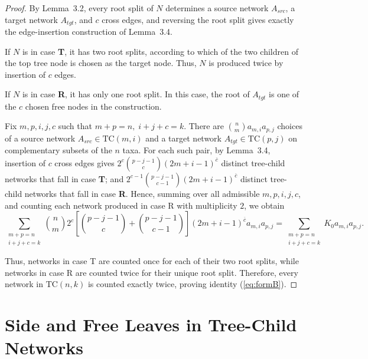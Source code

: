 \documentclass[11pt]{article}
\theoremstyle{definition}
\theoremstyle{remark}
\newcommand{\TC}{\text{TC}}
\begin{document}
\begin{proof}
By Lemma~3.2, every root split of $N$
determines a source network $A_{src}$, a target network $A_{tgt}$, and $c$
cross edges, and reversing the root split gives exactly the
edge-insertion construction of Lemma~3.4.

If $N$ is in case \textbf{T}, it has two root splits, according to
which of the two children of the top tree node is chosen as the target
node. Thus, $N$ is produced twice by insertion of $c$ edges.

If $N$ is in case \textbf{R}, it has only one root split. In this case, the root of $A_{tgt}$ is one of the $c$ chosen free nodes in the construction. 

Fix $m,p,i,j,c$ such that
$
m+p=n,\; i+j+c=k.
$
There are ${n\choose m}a_{m,i}a_{p,j}$
choices of a source network $A_{src}\in\TC(m,i)$ and a target network
$A_{tgt}\in\TC(p,j)$ on complementary subsets of the $n$ taxa.
For each such pair, by Lemma~3.4, insertion of $c$ cross edges gives 
$2^c{p-j-1\choose c}(2m+i-1)^{\overline c}$
distinct tree-child networks that fall in case {\bf T};
and $2^{c-1}{p-j-1\choose c-1}(2m+i-1)^{\overline c}$
distinct tree-child networks that fall in case {\bf R}.
Hence, summing over all admissible $m,p,i,j,c$, and counting each network produced in case R with multiplicity $2$, we obtain
\[
\sum_{\substack{m+p=n\\ i+j+c=k}}
{n\choose m}
2^c\left[{p-j-1\choose c}+{p-j-1\choose c-1}\right](2m+i-1)^{\overline c}
a_{m,i}a_{p,j}
=
\sum_{\substack{m+p=n\\ i+j+c=k}}
K_0a_{m,i}a_{p,j}.
\]

Thus, networks in case T are counted once for each of their two root splits, while networks in case R are counted twice for their unique root split. Therefore, every network in $\mathrm{TC}(n,k)$ is counted exactly twice, proving identity (\ref{eq:formB}).
\end{proof}



\section{Side and Free Leaves in Tree-Child Networks}
\end{document}
